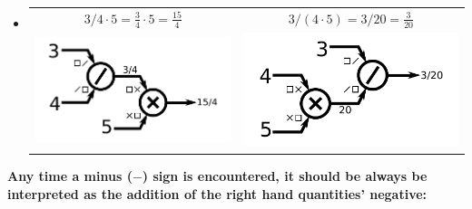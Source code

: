 \documentclass{article}
\begin{document}
\begin{itemize}
\begin{tabular}{cc}
\end{tabular}
\item 
\begin{tabular}{cc}
\(3 / 4 \cdot 5 = \frac{3}{4} \cdot 5 = \frac{15}{4}\) & \(3 / (4 \cdot 5) = 3 / 20 = \frac{3}{20}\) \\ 
\includegraphics[scale = 0.8]{expression_tree_7} & \includegraphics[scale = 0.8]{expression_tree_8}
\end{tabular}
\end{itemize}

{\bf Any time a minus (\(-\)) sign is encountered, it should be always be interpreted as the addition of the right hand quantities' negative:}
\end{document}
